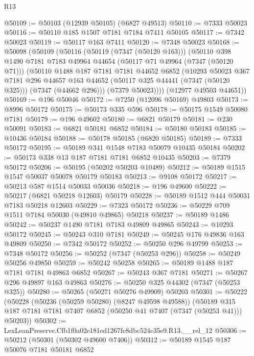 \begin{lexlean}{R13}
\begin{coremodule}
@50109 := @50103 (@12939 @50105) (@6827 @49513)
@50110 := @7333 @50023
@50116 := @50110 @185 @1507 @7181 @7184 @7411 @50105
@50117 := @7342 @50023
@50119 := @50117 @163 @7411
@50120 := @7348 @50023
@50168 := @50098
    (@50109
      (@50116
        (@50119 (@7347 (@50120 @163)))
        (@50110
          @398
          @1490
          @7181
          @7183
          @49964
          @44654
          (@50117 @71 @49964 (@7347 (@50120 @71)))
          (@50110
            @1488
            @187
            @7181
            @7181
            @44652
            @6852
            (@10293
              @50023
              @367
              @7181
              @296
              @44657
              @163
              @44652
              (@50117 @325 @44441 (@7347 (@50120 @325)))
              (@7347 (@44662 @296)))
            (@7379 @50023))))
      (@12977 @49503 @44651))
@50169 := @196 @50046
@50172 := @7250 (@12096 @50169) @49803
@50173 := @8996 @50172
@50175 := @50173 @335 @596
@50178 := @50175 @1549 @50080 @7181
@50179 := @196 @49602
@50180 := @6821 @50179
@50181 := @230 @50091
@50183 := @6821 @50181 @6852
@50184 := @50180 @50183
@50185 := @10436 @50184
@50188 := @50178 @50185 (@6820 @50185)
@50189 := @7333 @50172
@50195 := @50189 @341 @1548 @7183 @50079 @10435 @50184
@50202 := @50173 @338 @13 @187 @7181 @7181 @6852 @10435
@50203 := @7379 @50172
@50206 := @50195 (@50202 @50203 @10489)
@50212 := @50189 @1515 @1547 @50037 @50078 @50179 @50183
@50213 := @9108 @50172
@50217 := @50213 @587 @1514 @50033 @50036
@50218 := @196 @49600
@50222 := @50217 (@6821 @50218 @12603) @50179
@50228 := @50189 @1512 @444 @50031 @7183 @50218 @12603
@50229 := @7323 @50172
@50236 := @50229 @709 @1511 @7184 @50030 (@49810 @49865) @50218
@50237 := @50189 @1486
@50242 := @50237 @1490 @7181 @7183 @49809 @49865
@50243 := @10293 @50172
@50245 := @50243 @310 @7181
@50249 := @50245 @176 @49836 @163 @49809
@50250 := @7342 @50172
@50252 := @50250 @296 @49799
@50253 := @7348 @50172
@50256 := @50252 (@7347 (@50253 @296))
@50258 := @50249 @50256 @49850
@50259 := @50242 @50258
@50265 := @50189 @1488 @187 @7181 @7181 @49863 @6852
@50267 := @50243 @367 @7181
@50271 := @50267 @296 @49897 @163 @49863
@50276 := @50250 @325 @44302 (@7347 (@50253 @325))
@50280 := @50265 (@50271 @50276 @49909) @50203
@50301 := @50222
    (@50228
      (@50236 (@50259 @50280) (@8247 @49598 @49588))
      (@50189 @315 @187 @7181 @7181 @7407 @6852 (@50250 @41 @7407 (@7347 (@50253 @41))) @50203))
@50302 := LexLeanPreserve.Cfb1f0a02e181ed1267fc8dbc524c35e9.R13.__rel_12
@50306 := @50212 (@50301 (@50302 @49600 @7406))
@50312 := @50189 @1545 @187 @50076 @7181 @50181 @6852

\end{coremodule}
\end{lexlean}
